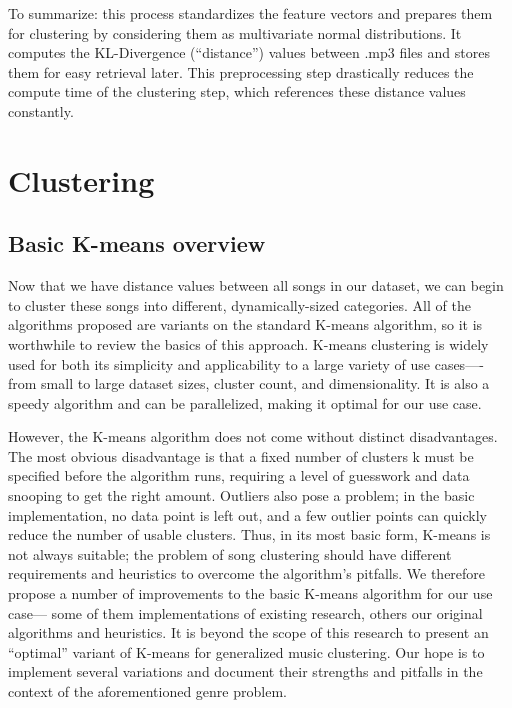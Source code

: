 \documentclass[12pt,twocolumn,titlepage]{article}
\begin{document}
To summarize: this process standardizes the feature vectors and prepares them for clustering by considering them as multivariate normal distributions. It computes the KL-Divergence (``distance'') values between .mp3 files and stores them for easy retrieval later. This preprocessing step drastically reduces the compute time of the clustering step, which references these distance values constantly.


\section{Clustering}
\label{sec:clustering}

\subsection{Basic K-means overview}

Now that we have distance values between all songs in our dataset, we can begin to cluster these songs into different, dynamically-sized categories. All of the algorithms proposed are variants on the standard K-means algorithm, so it is worthwhile to review the basics of this approach. K-means clustering is widely used for both its simplicity and applicability to a large variety of use cases—- from small to large dataset sizes, cluster count, and dimensionality. It is also a speedy algorithm and can be parallelized, making it optimal for our use case.


However, the K-means algorithm does not come without distinct disadvantages.  The most obvious disadvantage is that a fixed number of clusters k must be specified before the algorithm runs, requiring a level of guesswork and data snooping to get the right amount. Outliers also pose a problem; in the basic implementation, no data point is left out, and a few outlier points can quickly reduce the number of usable clusters. \cite{Sing} Thus, in its most basic form, K-means is not always suitable; the problem of song clustering should have different requirements and heuristics to overcome the algorithm's pitfalls. We therefore propose a number of improvements to the basic K-means algorithm for our use case— some of them implementations of existing research, others our original algorithms and heuristics. It is beyond the scope of this research to present an ``optimal'' variant of K-means for generalized music clustering. Our hope is to implement several variations and document their strengths and pitfalls in the context of the aforementioned genre problem.
\end{document}
